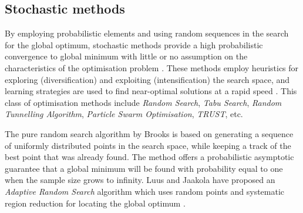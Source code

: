 	\subsection{Stochastic methods}
	By employing probabilistic elements and using random sequences in the search for the global optimum, stochastic methods  provide a high probabilistic convergence to global minimum with little or no assumption on the characteristics of the optimisation problem \cite{Rangaiah:2010aa}. These methods employ heuristics for exploring (diversification) and exploiting (intensification) the search space, and learning strategies are used to find near-optimal solutions at a rapid speed \cite{Blum:2003aa}. This class of optimisation methods include \emph{Random Search}, \emph{Tabu Search}, \emph{Random Tunnelling Algorithm}, \emph{Particle Swarm Optimisation}, \emph{TRUST}, etc.

	The pure random search algorithm by Brooks \cite{Brooks:1958aa} is based on generating a sequence of uniformly distributed points in the search space, while keeping a track of the best point that was already found. The method offers a probabilistic asymptotic guarantee that a global minimum will be found with probability equal to one when the sample size grows to infinity. Luus and Jaakola have proposed an \emph{Adaptive Random Search} algorithm which uses random points and systematic region reduction for locating the global optimum \cite{Luus:1973aa}.

